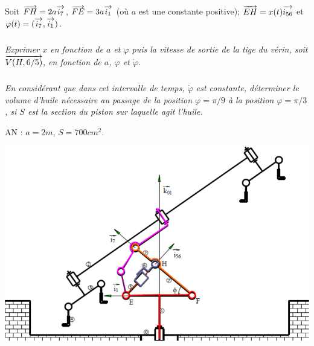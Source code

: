 \documentclass[10pt,oneside]{article}
\begin{document}
Soit $\overrightarrow{FH}=2a\overrightarrow{i_7}$, $\overrightarrow{FE}=3a\overrightarrow{i_1}$ (où $a$ est une constante positive); $\overrightarrow{EH}=x(t)\overrightarrow{i_{56}}$ et $\varphi(t)=(\overrightarrow{i_7},\overrightarrow{i_1})$.

\subparagraph{}
\textit{Exprimer $x$ en fonction de $a$ et $\varphi$ puis la vitesse de sortie de la tige du vérin, soit $\overrightarrow{V(H,6/5)}$, en fonction de $a$, $\varphi$ et $\dot{\varphi}$.}


\subparagraph{}
\textit{En considérant que dans cet intervalle de temps, $\dot{\varphi}$ est constante, déterminer le volume d'huile nécessaire au passage de la position $\varphi=\pi/9$ à la position $\varphi=\pi/3$, si $S$ est la section du piston sur laquelle agit l'huile.}


AN : $a=2m$, $S=700cm^2$.

\begin{center}
 \includegraphics[width=\textwidth]{png/exo3}
\end{center}
\end{document}
